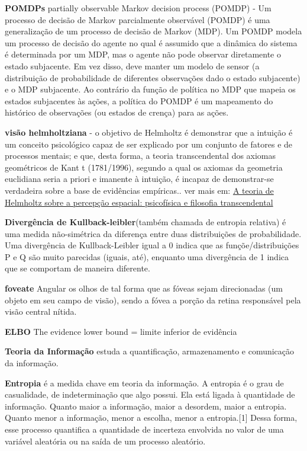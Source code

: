 \documentclass[
  12pt,
]{book}
\begin{document}
\textbf{POMDPs} partially observable Markov decision process (POMDP) - Um processo de decisão de Markov parcialmente observável (POMDP) é uma generalização de um processo de decisão de Markov (MDP). Um POMDP modela um processo de decisão do agente no qual é assumido que a dinâmica do sistema é determinada por um MDP, mas o agente não pode observar diretamente o estado subjacente. Em vez disso, deve manter um modelo de sensor (a distribuição de probabilidade de diferentes observações dado o estado subjacente) e o MDP subjacente. Ao contrário da função de política no MDP que mapeia os estados subjacentes às ações, a política do POMDP é um mapeamento do histórico de observações (ou estados de crença) para as ações.

\textbf{visão helmholtziana} - o objetivo de Helmholtz é demonstrar que a intuição é um conceito psicológico capaz de ser explicado por um conjunto de fatores e de processos mentais; e que, desta forma, a teoria transcendental dos axiomas geométricos de Kant t (1781/1996), segundo a qual os axiomas da geometria euclidiana seria a
priori e imanente à intuição, é incapaz de demonstrar-se verdadeira sobre a base de
evidências empíricas..
ver mais em: \href{https://periodicos.ufmg.br/index.php/memorandum/article/download/6857/4411/22713}{A teoria de Helmholtz sobre a percepção espacial: psicofísica e
filosofia transcendental}

\textbf{Divergência de Kullback-leibler}(também chamada de entropia relativa) é uma medida não-simétrica da diferença entre duas distribuições de probabilidade. Uma divergência de Kullback-Leibler igual a 0 indica que as funçõe/distribuições P e Q são muito parecidas (iguais, até), enquanto uma divergência de 1 indica que se comportam de maneira diferente.

\textbf{foveate} Angular os olhos de tal forma que as fóveas sejam direcionadas (um objeto em seu campo de visão), sendo a fóvea a porção da retina responsável pela visão central nítida.

\textbf{ELBO} The evidence lower bound = limite inferior de evidência

\textbf{Teoria da Informação} estuda a quantificação, armazenamento e comunicação da informação.

\textbf{Entropia} é a medida chave em teoria da informação. A entropia é o grau de casualidade, de indeterminação que algo possui. Ela está ligada à quantidade de informação. Quanto maior a informação, maior a desordem, maior a entropia. Quanto menor a informação, menor a escolha, menor a entropia.{[}1{]} Dessa forma, esse processo quantifica a quantidade de incerteza envolvida no valor de uma variável aleatória ou na saída de um processo aleatório.
\end{document}
